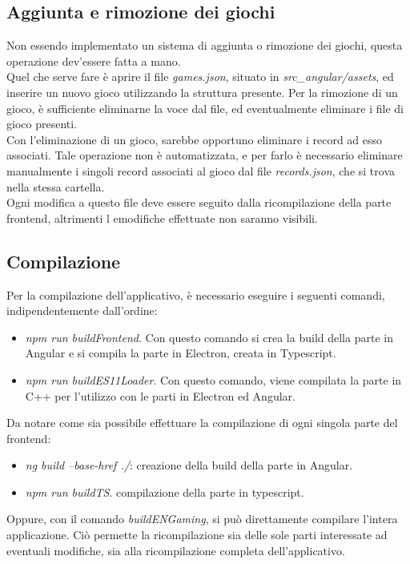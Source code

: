 \subsection{Aggiunta e rimozione dei giochi}
Non essendo implementato un sistema di aggiunta o rimozione dei giochi, questa operazione dev'essere fatta a mano.\\
Quel che serve fare è aprire il file \textit{games.json}, situato in \textit{src_angular/assets}, ed inserire un nuovo gioco utilizzando la struttura presente. Per la rimozione di un gioco, è sufficiente eliminarne la voce dal file, ed eventualmente eliminare i file di gioco presenti.\\
Con l'eliminazione di un gioco, sarebbe opportuno eliminare i record ad esso associati. Tale operazione non è automatizzata, e per farlo è necessario eliminare manualmente i singoli record associati al gioco dal file \textit{records.json}, che si trova nella stessa cartella.\\
Ogni modifica a questo file deve essere seguito dalla ricompilazione della parte frontend, altrimenti l emodifiche effettuate non saranno visibili.
\subsection{Compilazione}
Per la compilazione dell'applicativo, è necessario eseguire i seguenti comandi, indipendentemente dall'ordine:
\begin{itemize}
    \item \textit{npm run buildFrontend}. Con questo comando si crea la build della parte in Angular e si compila la parte in Electron, creata in Typescript.
    \item \textit{npm run buildES11Loader}. Con questo comando, viene compilata la parte in C++ per l'utilizzo con le parti in Electron ed Angular.
\end{itemize}
Da notare come sia possibile effettuare la compilazione di ogni singola parte del frontend:
\begin{itemize}
    \item \textit{ng build --base-href ./}: creazione della build della parte in Angular.
    \item \textit{npm run buildTS}. compilazione della parte in typescript.
\end{itemize}
Oppure, con il comando \textit{buildENGaming}, si può direttamente compilare l'intera applicazione. Ciò permette la ricompilazione sia delle sole parti interessate ad eventuali modifiche, sia alla ricompilazione completa dell'applicativo.
